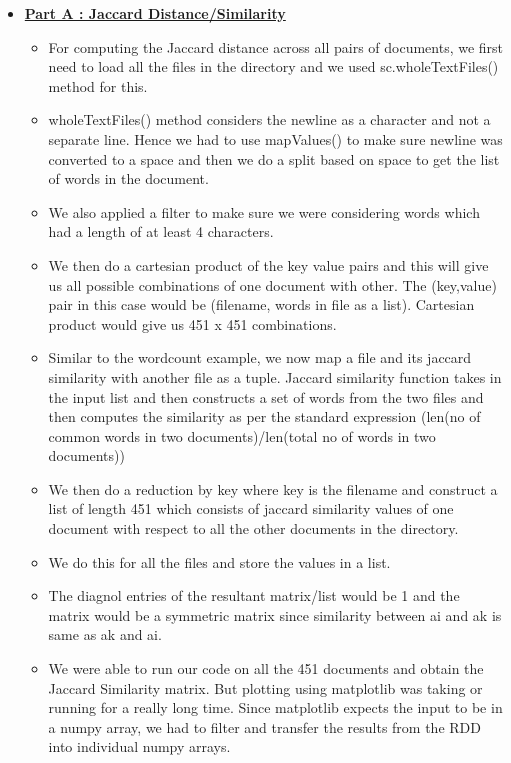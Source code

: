 \documentclass[11pt]{article}
\begin{document}
\begin{itemize}
\item[] \textbf{\underline{Part A : Jaccard Distance/Similarity}} 

\begin{itemize}

\item[] For computing the Jaccard distance across all pairs of documents, we first need to load all the files in the directory and we used sc.wholeTextFiles() method for this.

\item[] wholeTextFiles() method considers the newline as a character and not a separate line. Hence we had to use mapValues() to make sure newline was converted to a space and then we do a split based on space to get the list of words in the document.

\item We also applied a filter to make sure we were considering words which had a length of at least 4 characters.

\item We then do a cartesian product of the key value pairs and this will give us all possible combinations of one document with other. The (key,value) pair in this case would be (filename, words in file as a list). Cartesian product would give us 451 x 451 combinations.

\item Similar to the wordcount example, we now map a file and its jaccard similarity with another file as a tuple. Jaccard similarity function takes in the input list and then constructs a set of words from the two files and then computes the similarity as per the standard expression (len(no of common words in two documents)/len(total no of words in two documents))

\item We then do a reduction by key where key is the filename and construct a list of length 451 which consists of jaccard similarity values of one document with respect to all the other documents in the directory.

\item We do this for all the files and store the values in a list.

\item[] The diagnol entries of the resultant matrix/list would be 1 and the matrix would be a symmetric matrix since similarity between ai and ak is same as ak and ai.

\item[] We were able to run our code on all the 451 documents and obtain the Jaccard Similarity matrix. But plotting using matplotlib was taking or running for a really long time. Since matplotlib expects the input to be in a numpy array, we had to filter and transfer the results from the RDD into individual numpy arrays.


\end{itemize}
\end{itemize}
\end{document}
